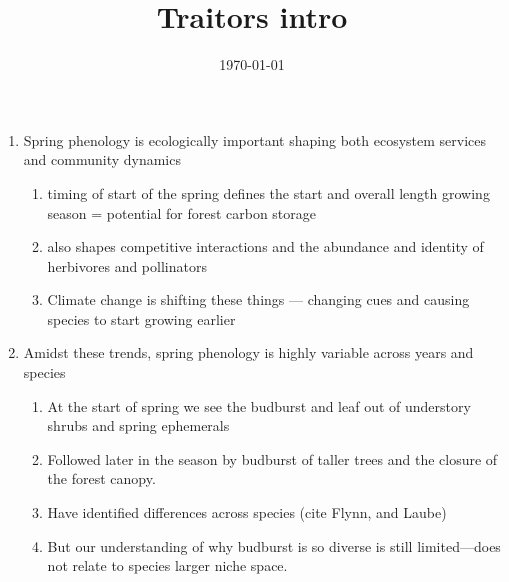 \documentclass{article}
\begin{document}
\title{Traitors intro}
\date{\today}

\maketitle 

\begin{enumerate}

\item Spring phenology is ecologically important shaping both ecosystem services and community dynamics %
\begin{enumerate}
\item timing of start of the spring defines the start and overall length growing season = potential for forest carbon storage
\item also shapes competitive interactions and the abundance and identity of herbivores and pollinators 
\item Climate change is shifting these things --- changing cues and causing species to start growing earlier
\end{enumerate}

\item Amidst these trends, spring phenology is highly variable across years and species %
\begin{enumerate}
\item At the start of spring we see the budburst and leaf out of understory shrubs and spring ephemerals
\item Followed later in the season by budburst of taller trees and the closure of the forest canopy.
\item Have identified differences across species (cite Flynn, and Laube)
\item But our understanding of why budburst is so diverse is still limited---does not relate to species larger niche space.
\end{enumerate} 


\end{enumerate}
\end{document}
